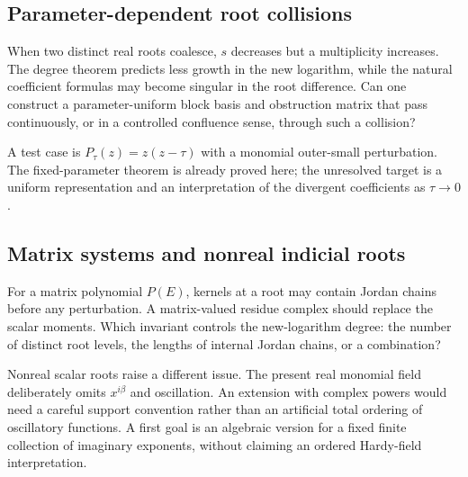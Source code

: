\documentclass[11pt,a4paper]{article}
\numberwithin{equation}{section}
\theoremstyle{definition}
\theoremstyle{remark}
\begin{document}
\subsection{Parameter-dependent root collisions}
When two distinct real roots coalesce, $s$ decreases but a multiplicity increases. The degree theorem predicts less growth in the new logarithm, while the natural coefficient formulas may become singular in the root difference. Can one construct a parameter-uniform block basis and obstruction matrix that pass continuously, or in a controlled confluence sense, through such a collision?

A test case is $P_\tau(z)=z(z-\tau)$ with a monomial outer-small perturbation. The fixed-parameter theorem is already proved here; the unresolved target is a uniform representation and an interpretation of the divergent coefficients as $\tau\to0$.

\subsection{Matrix systems and nonreal indicial roots}
For a matrix polynomial $P(E)$, kernels at a root may contain Jordan chains before any perturbation. A matrix-valued residue complex should replace the scalar moments. Which invariant controls the new-logarithm degree: the number of distinct root levels, the lengths of internal Jordan chains, or a combination?

Nonreal scalar roots raise a different issue. The present real monomial field deliberately omits $x^{i\beta}$ and oscillation. An extension with complex powers would need a careful support convention rather than an artificial total ordering of oscillatory functions. A first goal is an algebraic version for a fixed finite collection of imaginary exponents, without claiming an ordered Hardy-field interpretation.
\end{document}
